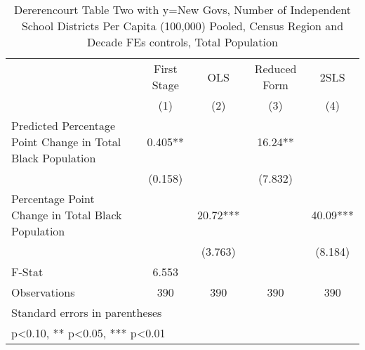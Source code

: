 \begin{table}[htbp]\centering
\def\sym#1{\ifmmode^{#1}\else\(^{#1}\)\fi}
\caption{Dererencourt Table Two with y=New Govs, Number of Independent School Districts Per Capita (100,000) Pooled, Census Region and Decade FEs controls, Total Population}
\begin{tabular}{l*{4}{c}}
\toprule
                    & First Stage   &         OLS   &Reduced Form   &        2SLS   \\
                    &\multicolumn{1}{c}{(1)}   &\multicolumn{1}{c}{(2)}   &\multicolumn{1}{c}{(3)}   &\multicolumn{1}{c}{(4)}   \\
\midrule
Predicted Percentage Point Change in Total Black Population&       0.405** &               &       16.24** &               \\
                    &     (0.158)   &               &     (7.832)   &               \\
\addlinespace
Percentage Point Change in Total Black Population&               &       20.72***&               &       40.09***\\
                    &               &     (3.763)   &               &     (8.184)   \\
\midrule
F-Stat              &       6.553   &               &               &               \\
Observations        &         390   &         390   &         390   &         390   \\
\bottomrule
\multicolumn{5}{l}{\footnotesize Standard errors in parentheses}\\
\multicolumn{5}{l}{\footnotesize * p<0.10, ** p<0.05, *** p<0.01}\\
\end{tabular}
\end{table}
